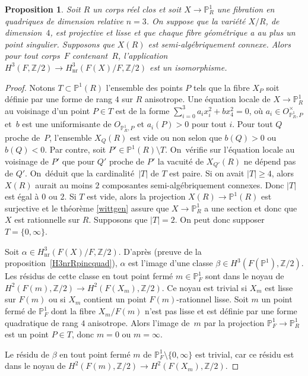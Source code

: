 \documentclass[JEP,XML,SOM,Unicode,francais,published]{cedram}
\newtheorem{prop}[thm]{Proposition}
\theoremstyle{definition}
\newcommand{\Z}{\mathbb Z}
\renewcommand{\P}{\mathbb P}
\newcommand{\on}[1]{\operatorname{#1}}
\begin{document}
\begin{prop}\label{fibP1Rrel3}
Soit $R$ un corps réel clos et soit $X\to \P^1_{R}$ une fibration en quadriques de dimension relative $n= 3$.
On suppose que la variété $X/R$, de dimension~$4$, est projective et lisse
et que chaque fibre géométrique a au plus un point singulier. Supposons que $X(R)$ est semi-algébriquement connexe.
Alors pour tout corps~$F$ contenant~$R$,
l'application $H^3(F,\Z/2) \to H^3_{\on{nr}}(F(X)/F, \Z/2)$ est
un isomorphisme.
\end{prop}
\begin{proof}

Notons $T\subset \P^1(R)$ l'ensemble des points $P$ tels que la fibre $X_P$ soit définie par une forme de rang $4$ sur $R$ anisotrope. Une équation locale de $X\to \P^1_R$ au voisinage d'un point $P\in T$ est de la forme $\sum_{i=0}^3 a_ix_i^2+bx_4^2=0$, où $a_i\in O_{\P^1_R,P}^\times$ et~$b$ est une uniformisante de $O_{\P^1_R,P}$ et $a_i(P)>0$ pour tout $i$.
Pour tout $Q$ proche de~$P$, l'ensemble $X_Q(R)$ est vide ou non selon que $b(Q)>0$ ou $b(Q)<0$. Par contre, soit $P'\in \P^1(R)\setminus T$. On~vérifie sur l'équation locale au voisinage de $P'$ que pour $Q'$ proche de $P'$ la vacuité de $X_{Q'}(R)$ ne dépend pas de $Q'$. On~déduit que la cardinalité~$|T|$ de $T$ est paire. Si on avait $|T|\geq 4$, alors $X(R)$ aurait au moins $2$ composantes semi-algébriquement connexes. Donc $|T|$ est égal à $0$ ou $2$. Si $T$ est vide, alors la projection $X(R) \to \P^1(R)$ est surjective
et le théorème \ref{wittgen} assure que $X \to \P^1_{R}$ a une section
et donc que $X$ est rationnelle sur $R$.
Supposons que $|T|=2$.
On peut donc supposer $T=\{0,\infty\}$.

Soit $\alpha \in H^3_{\on{nr}}(F(X)/F, \Z/2)$. D'après \cite[Th.\,5]{kahn1998unramified} (\cf preuve de la proposition~\ref{H3nrRpincquad}),
$\alpha$ est l'image d'une classe $\beta \in H^3(F(\P^1),\Z/2)$.
Les résidus de cette classe en tout point fermé $m \in \P^1_{F}$
sont dans le noyau de $H^2(F(m), \Z/2) \to H^2(F(X_{m}), \Z/2)$.
Ce noyau est trivial si $X_{m}$ est lisse sur $F(m)$ ou si $X_m$ contient un point
$F(m)$\nobreakdash-rationnel lisse. Soit $m$ un point fermé de $\P^1_{F}$
dont la fibre $X_{m}/F(m)$ n'est pas lisse et est définie par
une forme quadratique de rang $4$ anisotrope.
Alors l'image de~$m$ par la projection $\P^1_{F}\to \P^1_{R}$ est
un point $P\in T$, donc $m=0$ ou $m=\infty$.

Le résidu de $\beta$ en tout point fermé $m$ de $\P^1_{F}\setminus \{0,\infty\}$ est trivial, car ce résidu est
dans le noyau de $H^2(F(m),\Z/2) \to H^2(F(X_{m}),\Z/2)$.


\end{proof}
\end{document}
